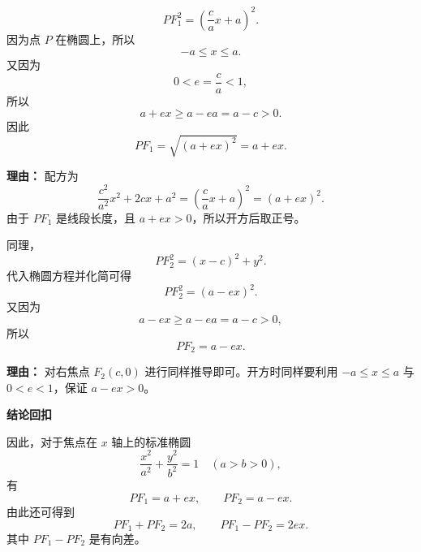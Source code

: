 \begin{proofbox}
\begin{description}[style=nextline, leftmargin=2.8em, labelsep=0.5em, itemsep=0.55em]
		\item[\textbf{步骤五（配方并开方）：}]
		      \[
			      PF_1^2=\left(\frac{c}{a}x+a\right)^2.
		      \]
		      因为点 $P$ 在椭圆上，所以
		      \[
			      -a\le x\le a.
		      \]
		      又因为
		      \[
			      0<e=\frac{c}{a}<1,
		      \]
		      所以
		      \[
			      a+ex\ge a-ea=a-c>0.
		      \]
		      因此
		      \[
			      PF_1=\sqrt{(a+ex)^2}=a+ex.
		      \]
		      \par\textbf{理由：} 配方为
		      \[
			      \frac{c^2}{a^2}x^2+2cx+a^2
			      =\left(\frac{c}{a}x+a\right)^2
			      =(a+ex)^2.
		      \]
		      由于 $PF_1$ 是线段长度，且 $a+ex>0$，所以开方后取正号。

		\item[\textbf{步骤六（对应右焦点）：}]
		      同理，
		      \[
			      PF_2^2=(x-c)^2+y^2.
		      \]
		      代入椭圆方程并化简可得
		      \[
			      PF_2^2=(a-ex)^2.
		      \]
		      又因为
		      \[
			      a-ex\ge a-ea=a-c>0,
		      \]
		      所以
		      \[
			      PF_2=a-ex.
		      \]
		      \par\textbf{理由：} 对右焦点 $F_2(c,0)$ 进行同样推导即可。开方时同样要利用 $-a\le x\le a$ 与 $0<e<1$，保证 $a-ex>0$。
	\end{description}

	\medskip
	\textbf{\textcolor{CProof}{结论回扣}}

	因此，对于焦点在 $x$ 轴上的标准椭圆
	\[
		\frac{x^2}{a^2}+\frac{y^2}{b^2}=1\quad (a>b>0),
	\]
	有
	\[
		PF_1=a+ex,\qquad PF_2=a-ex.
	\]
	由此还可得到
	\[
		PF_1+PF_2=2a,\qquad PF_1-PF_2=2ex.
	\]
	其中 $PF_1-PF_2$ 是有向差。
\end{proofbox}